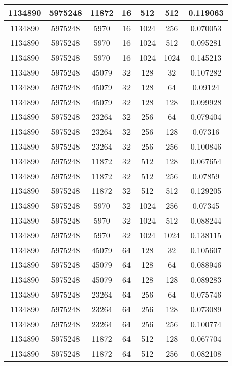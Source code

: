 \documentclass[9pt]{article}
\begin{document}
\begin{tabular}{|c|c|c|c|c|c|c| }
\hline
1134890  & 5975248  & 11872  & 16  & 512  & 512  & 0.119063 \\
\hline
1134890  & 5975248  & 5970  & 16  & 1024  & 256  & 0.070053 \\
\hline
1134890  & 5975248  & 5970  & 16  & 1024  & 512  & 0.095281 \\
\hline
1134890  & 5975248  & 5970  & 16  & 1024  & 1024  & 0.145213 \\
\hline
1134890  & 5975248  & 45079  & 32  & 128  & 32  & 0.107282 \\
\hline
1134890  & 5975248  & 45079  & 32  & 128  & 64  & 0.09124 \\
\hline
1134890  & 5975248  & 45079  & 32  & 128  & 128  & 0.099928 \\
\hline
1134890  & 5975248  & 23264  & 32  & 256  & 64  & 0.079404 \\
\hline
1134890  & 5975248  & 23264  & 32  & 256  & 128  & 0.07316 \\
\hline
1134890  & 5975248  & 23264  & 32  & 256  & 256  & 0.100846 \\
\hline
1134890  & 5975248  & 11872  & 32  & 512  & 128  & 0.067654 \\
\hline
1134890  & 5975248  & 11872  & 32  & 512  & 256  & 0.07859 \\
\hline
1134890  & 5975248  & 11872  & 32  & 512  & 512  & 0.129205 \\
\hline
1134890  & 5975248  & 5970  & 32  & 1024  & 256  & 0.07345 \\
\hline
1134890  & 5975248  & 5970  & 32  & 1024  & 512  & 0.088244 \\
\hline
1134890  & 5975248  & 5970  & 32  & 1024  & 1024  & 0.138115 \\
\hline
1134890  & 5975248  & 45079  & 64  & 128  & 32  & 0.105607 \\
\hline
1134890  & 5975248  & 45079  & 64  & 128  & 64  & 0.088946 \\
\hline
1134890  & 5975248  & 45079  & 64  & 128  & 128  & 0.089283 \\
\hline
1134890  & 5975248  & 23264  & 64  & 256  & 64  & 0.075746 \\
\hline
1134890  & 5975248  & 23264  & 64  & 256  & 128  & 0.073089 \\
\hline
1134890  & 5975248  & 23264  & 64  & 256  & 256  & 0.100774 \\
\hline
1134890  & 5975248  & 11872  & 64  & 512  & 128  & 0.067704 \\
\hline
1134890  & 5975248  & 11872  & 64  & 512  & 256  & 0.082108 \\

\end{tabular}
\end{document}
